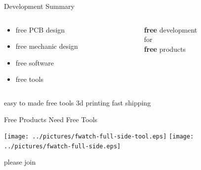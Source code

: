 \documentclass[compress,red]{beamer}
\begin{document}
\begin{frame}{Development Summary}
  \Large
  \begin{columns}[T] %
    \begin{column}{.55\textwidth}
      \begin{itemize}
       \item free PCB design
       \item free mechanic design
       \item free software
       \item free tools
      \end{itemize}
    \end{column}
    \hfill%
    \pause
    \begin{column}{.43\textwidth}
      \begin{center}
        \textbf{free} development \\
        for\\
        \textbf{free} products
      \end{center}
    \end{column}%
  \end{columns}
\end{frame}

\begin{frame}{easy to made}
 free tools
 3d printing
 fast shipping
\end{frame}

\begin{frame}{Free Products Need Free Tools}
 \begin{center}
   {
\texttt{[image: ../pictures/fwatch-full-side-tool.eps]}
  }{
\texttt{[image: ../pictures/fwatch-full-side.eps]}
  }
 \end{center}
\end{frame}

\begin{frame}{please join}
 
\end{frame}

\end{document}

